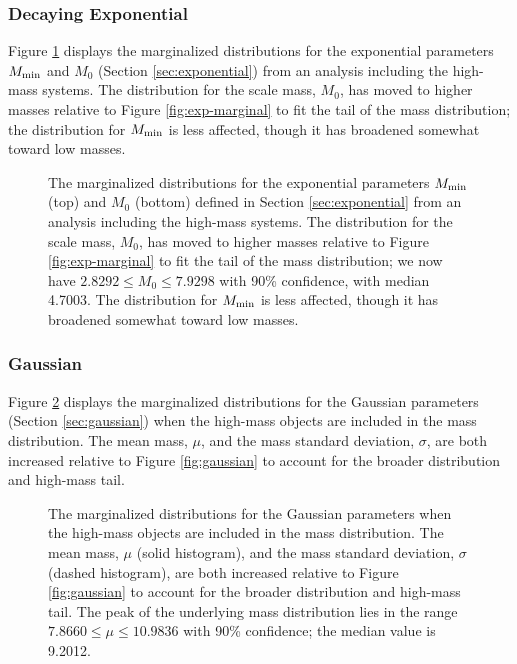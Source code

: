 \documentclass[preprint]{aastex}
\newcommand{\Mmin}{M_{\textnormal{min}}}
\begin{document}
\subsubsection{Decaying Exponential}

Figure \ref{fig:exp-cutoff-high} displays the marginalized
distributions for the exponential parameters $\Mmin$ and $M_0$
(Section \ref{sec:exponential}) from an analysis including the
high-mass systems.  The distribution for the scale mass, $M_0$, has
moved to higher masses relative to Figure \ref{fig:exp-marginal} to
fit the tail of the mass distribution; the distribution for $\Mmin$ is
less affected, though it has broadened somewhat toward low masses.

\begin{figure}
  \begin{center}
  \end{center}
  \caption{\label{fig:exp-cutoff-high} The marginalized distributions
    for the exponential parameters $\Mmin$ (top) and $M_0$ (bottom)
    defined in Section \ref{sec:exponential} from an analysis
    including the high-mass systems.  The distribution for the scale
    mass, $M_0$, has moved to higher masses relative to Figure
    \ref{fig:exp-marginal} to fit the tail of the mass distribution;
    we now have $2.8292 \leq M_0 \leq 7.9298$ with 90\% confidence,
    with median 4.7003.  The distribution for $\Mmin$ is less
    affected, though it has broadened somewhat toward low masses.}
\end{figure}

\subsubsection{Gaussian}

Figure \ref{fig:gaussian-high} displays the marginalized distributions
for the Gaussian parameters (Section \ref{sec:gaussian}) when the
high-mass objects are included in the mass distribution.  The mean
mass, $\mu$, and the mass standard deviation, $\sigma$, are both
increased relative to Figure \ref{fig:gaussian} to account for the
broader distribution and high-mass tail.

\begin{figure}
  \begin{center}
  \end{center}
  \caption{\label{fig:gaussian-high} The marginalized distributions
    for the Gaussian parameters when the high-mass objects are
    included in the mass distribution.  The mean mass, $\mu$ (solid
    histogram), and the mass standard deviation, $\sigma$ (dashed
    histogram), are both increased relative to Figure
    \ref{fig:gaussian} to account for the broader distribution and
    high-mass tail.  The peak of the underlying mass distribution
    lies in the range $7.8660 \leq \mu \leq 10.9836$ with 90\%
    confidence; the median value is 9.2012.}
\end{figure}
\end{document}
